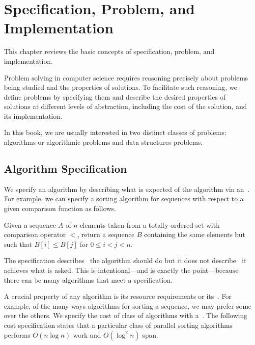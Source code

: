 \chapter{Specification, Problem, and Implementation}
\label{ch:introduction::spec}

\begin{preamble}
This chapter reviews the basic concepts of specification, problem, and
implementation.
\end{preamble}


\begin{gram}
Problem solving in computer science requires reasoning precisely about
problems being studied and the properties of solutions.
%
To facilitate such reasoning,  we define problems by
specifying them and describe the desired properties of solutions at
different levels of abstraction, including the cost of the solution, and its
implementation.

In this book, we are usually interested in two distinct classes of
problems: algorithms or algorithmic problems and data structures
problems.
\end{gram}

\section{Algorithm Specification}
\begin{gram}
We specify an algorithm by describing what is expected of the
algorithm via an~.
%
For example, we can specify a sorting algorithm for sequences with
respect to a given comparison function as follows.
\end{gram}

\begin{definition}
Given a sequence $A$ of $n$ elements taken from a totally ordered set
with comparison operator $<$, return a
sequence $B$ containing the same elements but such that $B[i] \leq
B[j]$ for $0 \leq i < j < n$.
\end{definition}

\begin{note}
The specification describes~ the algorithm should do but it
does not describe~ it achieves what is asked.
%
This is intentional---and is exactly the point---because there can be
many algorithms that meet a specification.
%
\end{note}

\begin{gram}
A crucial property of any algorithm is its resource requirements or
its~.
%
For example, of the many ways algorithms for sorting a sequence, we
may prefer some over the others.  
%
We specify the cost of class of algorithms with a~.  The following cost specification states that a
particular class of parallel sorting algorithms performs $O(n
\log{n})$ work and $O(\log^2{n})$ span.
\end{gram}

